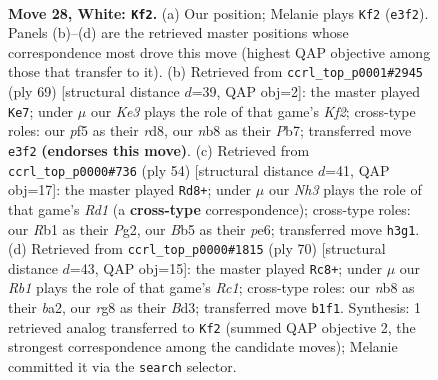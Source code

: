 \documentclass[11pt]{article}
\begin{document}
\clearpage

\begin{figure}[p]\centering
\begin{subfigure}{0.46\textwidth}\centering
\resizebox{\linewidth}{!}{%
\newchessgame
\chessboard[
  setfen={rn4r1/8/7k/1B1p1p1p/8/pP2K1PN/P7/1R6 w - - 1 28},
  showmover=false,
  pgfstyle=straightmove, color=movearrow, markmove={e3-f2}
]}
\caption{}
\end{subfigure}\hfill
\begin{subfigure}{0.46\textwidth}\centering
\resizebox{\linewidth}{!}{%
\newchessgame
\chessboard[
  setfen={3R4/1p3k1p/5p2/2P3pb/1P1Nr3/6P1/6P1/6K1 b - - 3 35},
  showmover=false,
  pgfstyle=straightmove, color=movearrow, markmove={f7-e7}
]}
\caption{}
\end{subfigure}
\\[4pt]
\begin{subfigure}{0.46\textwidth}\centering
\resizebox{\linewidth}{!}{%
\newchessgame
\chessboard[
  setfen={6k1/pr5p/2p1p1p1/6P1/4P3/1P6/P5P1/3R2K1 w - - 1 28},
  showmover=false,
  pgfstyle=straightmove, color=movearrow, markmove={d1-d8}
]}
\caption{}
\end{subfigure}\hfill
\begin{subfigure}{0.46\textwidth}\centering
\resizebox{\linewidth}{!}{%
\newchessgame
\chessboard[
  setfen={7k/p6p/3N2p1/3nP3/8/3B1KP1/br5P/2R5 w - - 2 36},
  showmover=false,
  pgfstyle=straightmove, color=movearrow, markmove={c1-c8}
]}
\caption{}
\end{subfigure}
\caption{\textbf{Move 28, White: \texttt{Kf2}.} (a) Our position; Melanie plays \texttt{Kf2} (\texttt{e3f2}). Panels (b)--(d) are the retrieved master positions whose correspondence most drove this move (highest QAP objective among those that transfer to it). (b) Retrieved from \texttt{ccrl\_top\_p0001\#2945} (ply 69) [structural distance $d$=39, QAP obj=2]: the master played \texttt{Ke7}; under $\mu$ our \emph{Ke3} plays the role of that game's \emph{Kf2}; cross-type roles: our \emph{p}f5 as their \emph{r}d8, our \emph{n}b8 as their \emph{P}b7; transferred move \texttt{e3f2} \textbf{(endorses this move)}. (c) Retrieved from \texttt{ccrl\_top\_p0000\#736} (ply 54) [structural distance $d$=41, QAP obj=17]: the master played \texttt{Rd8+}; under $\mu$ our \emph{Nh3} plays the role of that game's \emph{Rd1} (a \textbf{cross-type} correspondence); cross-type roles: our \emph{R}b1 as their \emph{P}g2, our \emph{B}b5 as their \emph{p}e6; transferred move \texttt{h3g1}. (d) Retrieved from \texttt{ccrl\_top\_p0000\#1815} (ply 70) [structural distance $d$=43, QAP obj=15]: the master played \texttt{Rc8+}; under $\mu$ our \emph{Rb1} plays the role of that game's \emph{Rc1}; cross-type roles: our \emph{n}b8 as their \emph{b}a2, our \emph{r}g8 as their \emph{B}d3; transferred move \texttt{b1f1}. Synthesis: 1 retrieved analog transferred to \texttt{Kf2} (summed QAP objective 2, the strongest correspondence among the candidate moves); Melanie committed it via the \texttt{search} selector.}
\label{fig:thought-m54}
\end{figure}
\end{document}
